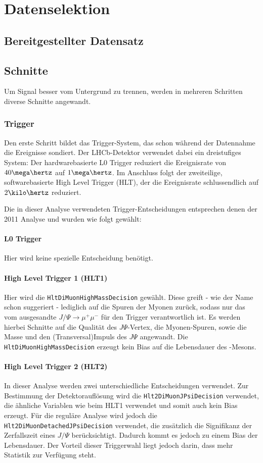 \chapter{Datenselektion}
\section{Bereitgestellter Datensatz}
\section{Schnitte}
Um Signal besser vom Untergrund zu trennen, werden in mehreren Schritten diverse Schnitte angewandt.
\subsection{Trigger}
Den erste Schritt bildet das Trigger-System, das schon während der Datennahme die Ereignisse sondiert. Der LHCb-Detektor verwendet dabei ein dreistufiges System: Der hardwarebasierte \glqq L0 Trigger \grqq reduziert die Ereignisrate von $40\mega\hertz$ auf $1\mega\hertz$. Im Anschluss folgt der zweiteilige, softwarebasierte \glqq High Level Trigger \grqq (HLT), der die Ereignisrate schlussendlich auf $2\kilo\hertz$ reduziert.\cite{trigger} 

Die in dieser Analyse verwendeten Trigger-Entscheidungen entsprechen denen der 2011 Analyse \cite{lhcb-paper} und wurden wie folgt gewählt:

\subsubsection{L0 Trigger}
Hier wird keine spezielle Entscheidung benötigt.

\subsubsection{High Level Trigger 1 (HLT1)}
Hier wird die \texttt{HltDiMuonHighMassDecision} gewählt. Diese greift - wie der Name schon suggeriert - lediglich auf die Spuren der Myonen zurück, sodass nur das vom \Bd ausgesandte $J/\Psi \rightarrow \mu^+\mu^-$ für den Trigger verantwortlich ist. Es werden hierbei Schnitte auf die Qualität des $J\Psi$-Vertex, die Myonen-Spuren, sowie die Masse und den (Transversal)Impuls des $J\Psi$ angewandt. Die \texttt{HltDiMuonHighMassDecision} erzeugt kein Bias auf die Lebensdauer des \Bd-Mesons.

\subsubsection{High Level Trigger 2 (HLT2)}
In dieser Analyse werden zwei unterschiedliche Entscheidungen verwendet. Zur Bestimmung der Detektorauflösung wird die \texttt{Hlt2DiMuonJPsiDecision} verwendet, die ähnliche Variablen wie beim HLT1 verwendet und somit auch kein Bias erzeugt. Für die reguläre Analyse wird jedoch die \texttt{Hlt2DiMuonDetachedJPsiDecision} verwendet, die zusätzlich die Signifikanz der Zerfallszeit eines $J/\Psi$ berücksichtigt. Dadurch kommt es jedoch zu einem Bias der Lebensdauer. Der Vorteil dieser Triggerwahl liegt jedoch darin, dass mehr Statistik zur Verfügung steht.

